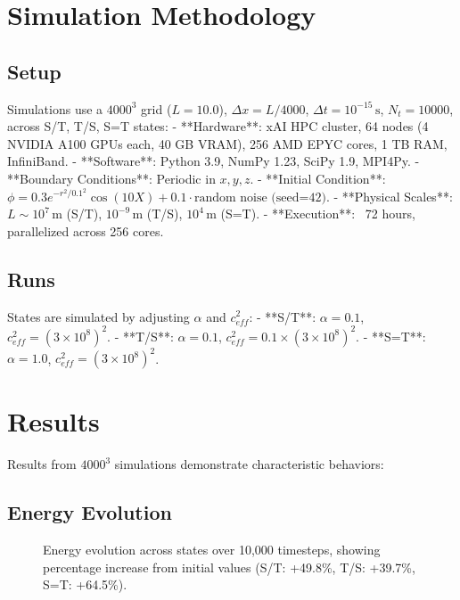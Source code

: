 \documentclass[11pt]{article}
\begin{document}
\section{Simulation Methodology}
\subsection{Setup}
Simulations use a \(4000^3\) grid (\(L = 10.0\)), \(\Delta x = L / 4000\), \(\Delta t = 10^{-15} \, \text{s}\), \(N_t = 10000\), across S/T, T/S, S=T states:
- **Hardware**: xAI HPC cluster, 64 nodes (4 NVIDIA A100 GPUs each, 40 GB VRAM), 256 AMD EPYC cores, 1 TB RAM, InfiniBand.
- **Software**: Python 3.9, NumPy 1.23, SciPy 1.9, MPI4Py.
- **Boundary Conditions**: Periodic in \(x, y, z\).
- **Initial Condition**: \(\phi = 0.3 e^{-r^2 / 0.1^2} \cos(10 X) + 0.1 \cdot \text{random noise (seed=42)}\).
- **Physical Scales**: \(L \sim 10^7 \, \text{m}\) (S/T), \(10^{-9} \, \text{m}\) (T/S), \(10^4 \, \text{m}\) (S=T).
- **Execution**: ~72 hours, parallelized across 256 cores.

\subsection{Runs}
States are simulated by adjusting \(\alpha\) and \(c_{eff}^2\):
- **S/T**: \(\alpha = 0.1\), \(c_{eff}^2 = (3 \times 10^8)^2\).
- **T/S**: \(\alpha = 0.1\), \(c_{eff}^2 = 0.1 \times (3 \times 10^8)^2\).
- **S=T**: \(\alpha = 1.0\), \(c_{eff}^2 = (3 \times 10^8)^2\).

\section{Results}
Results from \(4000^3\) simulations demonstrate characteristic behaviors:

\subsection{Energy Evolution}
\begin{figure}[htbp]
\centering
{}
\caption{Energy evolution across states over 10,000 timesteps, showing percentage increase from initial values (S/T: +49.8\%, T/S: +39.7\%, S=T: +64.5\%).}
\label{fig:energy}
\end{figure}
\end{document}
